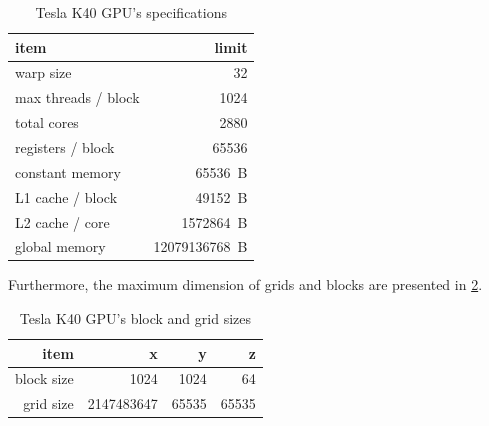 \begin{table}[htb]
  \centering
  \begin{tabular}{l r}
    \toprule
    item                        & limit \\
    \midrule
    warp size                   & \SI{32}{} \\
    max threads / block         & \SI{1024}{} \\
    total cores                 & \SI{2880}{} \\
    registers / block           & \SI{65536}{} \\
    constant memory             & \SI{65536}{B} \\
    L1 cache / block            & \SI{49152}{B}  \\
    L2 cache / core             & \SI{1572864}{B}  \\
    global memory               & \SI{12079136768}{B} \\
    \bottomrule
  \end{tabular}
  \caption{Tesla K40 GPU's specifications}
  \label{tab:tesla k40 specs}
\end{table}

Furthermore, the maximum dimension of grids and blocks are presented in \cref{tab:tesla k40 grid and block}.

\begin{table}[htb]
  \centering
  \begin{tabular}{r r r r}
    \toprule
    item & x & y & z \\
    \midrule
    block size & \SI{1024}{} & \SI{1024}{} & \SI{64}{} \\
    grid size  & \SI{2147483647}{} & \SI{65535}{} & \SI{65535}{} \\
    \bottomrule
  \end{tabular}
  \caption{Tesla K40 GPU's block and grid sizes}
  \label{tab:tesla k40 grid and block}
\end{table}
